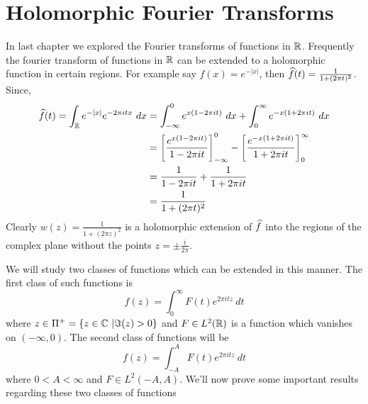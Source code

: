 \section{Holomorphic Fourier Transforms}

In last chapter we explored the Fourier transforms of functions in $\mathbb R$. Frequently the fourier transform of functions in $\mathbb R$ can be extended to a holomorphic function in certain regions. For example say $f(x) = e^{-|x|}$, then $\widehat{f}(t) = \frac{1}{1+(2\pi t)^2}$. 
Since, 
\begin{align*}
  \widehat{f}(t) = \int_\mathbb R e^{-|x|}e^{-2 \pi itx} \ dx &= \int_{-\infty}^0 e^{x(1-2\pi it)} \ dx + \int_0^{\infty} e^{-x(1+2\pi it)} \ dx \\
  & = \left[ \frac{e^{x(1-2\pi it)}}{1-2\pi it}\right]_{-\infty}^0 - \left[ \frac{e^{-x(1+2\pi it)}}{1+2\pi it}\right]^{\infty}_0 \\
  & = \frac{1}{1-2\pi it} + \frac{1}{1+2\pi it} \\
  &= \frac{1}{1+(2\pi t)^2}
\end{align*}
Clearly $w(z) = \frac{1}{1+(2\pi z)^2}$ is a holomorphic extension of $\widehat{f}$ into the regions of the complex plane without the points $z=\pm \frac{i}{2\pi}$.

We will study two classes of functions which can be extended in this manner. The first class of such functions is $$f(z) = \int_0^\infty F(t)e^{2\pi i tz}\ dt$$
where $z\in \Pi^+ = \{z\in \mathbb C \ | \Im(z) > 0 \}$ and $F \in L^2(\mathbb R)$ is a function which vanishes on $(-\infty, 0)$. The second class of functions will be $$f(z) = \int_{-A}^A F(t)e^{2\pi i t z} \ dt$$
where $0<A<\infty$ and $F \in L^2(-A, A)$. We'll now prove some important results regarding these two classes of functions

